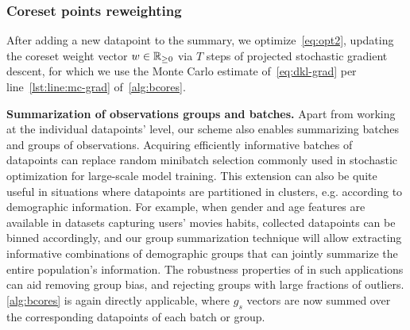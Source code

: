 \subsubsection{Coreset points reweighting}
After adding a new datapoint to the summary, we optimize~\cref{eq:opt2}, updating the coreset weight vector $w\in\mathbb{R}_{\geq 0}$ via $T$ steps of projected stochastic gradient descent, for which we use the Monte Carlo estimate of~\cref{eq:dkl-grad} per line~\ref{lst:line:mc-grad} of~\cref{alg:bcores}.
\begin{comment}
\[
\hat{\nabla}_w := -\frac{1}{S} \sum_{s=1}^{S} g_s \left(\frac{N}{B}1^Tg_s - w^T g_s\right) \in \reals_{d}, 
\label{eq:gradw}
\]
where $g_s$ are defined as in~\cref{eq:sampled-potentials}.
\end{comment}
\vspace{.2cm}
\par 
\textbf{Summarization of observations groups and batches.}
Apart from working at the individual datapoints' level, our scheme also enables summarizing batches and groups of observations. Acquiring efficiently informative batches of datapoints can replace random minibatch selection commonly used in stochastic optimization for large-scale model training. This extension can also be quite useful in situations where datapoints are partitioned in clusters, e.g. according to demographic information. For example, when gender and age features are available in datasets capturing users' movies habits, collected datapoints can be binned accordingly, and our group summarization technique will allow extracting informative combinations of demographic groups that can jointly summarize the entire population's information. The robustness properties of \bcores{} in such applications can aid removing group bias, and rejecting groups with large fractions of outliers. \cref{alg:bcores} is again directly applicable, where $g_s$ vectors are now summed over the corresponding datapoints of each batch or group.
